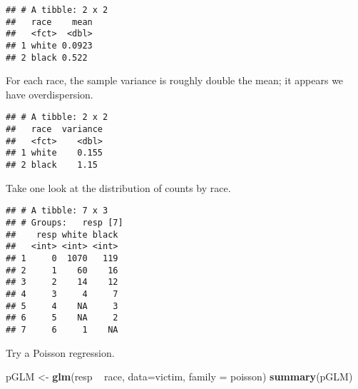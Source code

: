 \documentclass[]{article}
\newenvironment{Shaded}{\begin{snugshade}}{\end{snugshade}}
\newcommand{\KeywordTok}[1]{\textcolor[rgb]{0.13,0.29,0.53}{\textbf{{#1}}}}
\newcommand{\DataTypeTok}[1]{\textcolor[rgb]{0.13,0.29,0.53}{{#1}}}
\newcommand{\StringTok}[1]{\textcolor[rgb]{0.31,0.60,0.02}{{#1}}}
\newcommand{\NormalTok}[1]{{#1}}
\begin{document}
\begin{verbatim}
## # A tibble: 2 x 2
##   race    mean
##   <fct>  <dbl>
## 1 white 0.0923
## 2 black 0.522
\end{verbatim}

For each race, the sample variance is roughly double the mean; it
appears we have overdispersion.

\begin{Shaded}
\end{Shaded}

\begin{verbatim}
## # A tibble: 2 x 2
##   race  variance
##   <fct>    <dbl>
## 1 white    0.155
## 2 black    1.15
\end{verbatim}

Take one look at the distribution of counts by race.

\begin{Shaded}
\end{Shaded}

\begin{verbatim}
## # A tibble: 7 x 3
## # Groups:   resp [7]
##    resp white black
##   <int> <int> <int>
## 1     0  1070   119
## 2     1    60    16
## 3     2    14    12
## 4     3     4     7
## 5     4    NA     3
## 6     5    NA     2
## 7     6     1    NA
\end{verbatim}

Try a Poisson regression.

\begin{Shaded}
\begin{Highlighting}[]
\NormalTok{pGLM <-}\StringTok{ }\KeywordTok{glm}\NormalTok{(resp ~}\StringTok{ }\NormalTok{race, }\DataTypeTok{data=}\NormalTok{victim, }\DataTypeTok{family =} \NormalTok{poisson)}
\KeywordTok{summary}\NormalTok{(pGLM)}
\end{Highlighting}
\end{Shaded}
\end{document}
